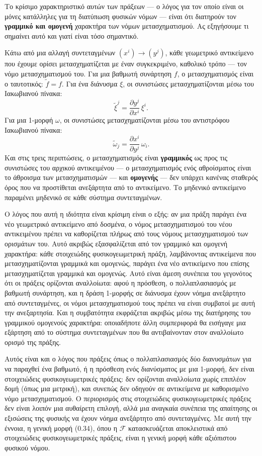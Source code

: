 \documentclass[12pt]{article}
\begin{document}
Το κρίσιμο χαρακτηριστικό αυτών των πράξεων — ο λόγος για τον οποίο είναι οι μόνες κατάλληλες για τη διατύπωση φυσικών νόμων — είναι ότι διατηρούν τον \textbf{γραμμικό και ομογενή} χαρακτήρα των νόμων μετασχηματισμού. Ας εξηγήσουμε τι σημαίνει αυτό και γιατί είναι τόσο σημαντικό.

Κάτω από μια αλλαγή συντεταγμένων $(x^i) \to (y^j)$, κάθε γεωμετρικό αντικείμενο που έχουμε ορίσει μετασχηματίζεται με έναν συγκεκριμένο, καθολικό τρόπο — τον νόμο μετασχηματισμού του. Για μια βαθμωτή συνάρτηση $f$, ο μετασχηματισμός είναι ο ταυτοτικός: $\tilde{f} = f$. Για ένα διάνυσμα $\xi$, οι συνιστώσες μετασχηματίζονται μέσω του Ιακωβιανού πίνακα:
\[
\tilde{\xi}^j = \frac{\partial y^j}{\partial x^i} \, \xi^i. \tag{0.35}
\]
Για μια 1-μορφή $\omega$, οι συνιστώσες μετασχηματίζονται μέσω του αντιστρόφου Ιακωβιανού πίνακα:
\[
\tilde{\omega}_j = \frac{\partial x^i}{\partial y^j} \, \omega_i. \tag{0.36}
\]
Και στις τρεις περιπτώσεις, ο μετασχηματισμός είναι \textbf{γραμμικός} ως προς τις συνιστώσες του αρχικού αντικειμένου — ο μετασχηματισμός ενός αθροίσματος είναι το άθροισμα των μετασχηματισμών — και \textbf{ομογενής} — δεν υπάρχει κανένας σταθερός όρος που να προστίθεται ανεξάρτητα από το αντικείμενο. Το μηδενικό αντικείμενο παραμένει μηδενικό σε κάθε σύστημα συντεταγμένων.

Ο λόγος που αυτή η ιδιότητα είναι κρίσιμη είναι ο εξής: αν μια πράξη παράγει ένα νέο γεωμετρικό αντικείμενο από δοσμένα, ο νόμος μετασχηματισμού του νέου αντικειμένου πρέπει να καθορίζεται πλήρως από τους νόμους μετασχηματισμού των ορισμάτων του. Αυτό ακριβώς εξασφαλίζεται από τον γραμμικό και ομογενή χαρακτήρα: κάθε στοιχειώδης φυσικογεωμετρική πράξη, λαμβάνοντας αντικείμενα που μετασχηματίζονται γραμμικά και ομογενώς, παράγει ένα νέο αντικείμενο που επίσης μετασχηματίζεται γραμμικά και ομογενώς. Αυτό είναι άμεση συνέπεια του γεγονότος ότι οι πράξεις ορίζονται αναλλοίωτα: αφού η πρόσθεση, ο πολλαπλασιασμός με βαθμωτή συνάρτηση, και η δράση 1-μορφής σε διάνυσμα έχουν νόημα ανεξάρτητο από συντεταγμένες, οι νόμοι μετασχηματισμού τους πρέπει να είναι συμβατοί με αυτή την ανεξαρτησία. Και η συμβατότητα εκφράζεται ακριβώς μέσω της διατήρησης του γραμμικού ομογενούς χαρακτήρα: οποιαδήποτε άλλη συμπεριφορά θα εισήγαγε μια εξάρτηση από το σύστημα συντεταγμένων που θα αντιβαίνονταν στον αναλλοίωτο ορισμό της πράξης.

Αυτός είναι και ο λόγος που πράξεις όπως ο πολλαπλασιασμός δύο διανυσμάτων για να παραχθεί ένα βαθμωτό, ή η πρόσθεση ενός διανύσματος με μια 1-μορφή, δεν είναι στοιχειώδεις φυσικογεωμετρικές πράξεις: δεν ορίζονται αναλλοίωτα χωρίς επιπλέον δομή (όπως μια μετρική), και συνεπώς δεν οδηγούν σε αντικείμενα με καθορισμένο νόμο μετασχηματισμού. Ο περιορισμός στις στοιχειώδεις φυσικογεωμετρικές πράξεις δεν είναι λοιπόν μια αυθαίρετη επιλογή, αλλά μια αναγκαία συνέπεια της απαίτησης οι εξισώσεις της φυσικής να έχουν νόημα ανεξάρτητο από συντεταγμένες. Με αυτή την έννοια, η γενική μορφή (0.34), όπου η $\mathcal{F}$ κατασκευάζεται αποκλειστικά από στοιχειώδεις φυσικογεωμετρικές πράξεις, είναι η γενική μορφή κάθε αξιόπιστου φυσικού νόμου.
\end{document}
